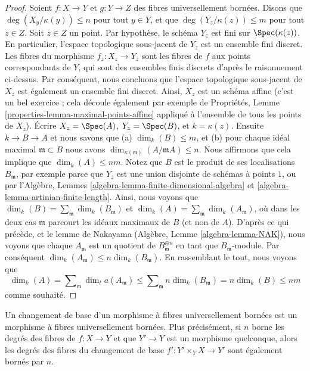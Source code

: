 \begin{proof}
Soient $f : X \to Y$ et $g : Y \to Z$ des fibres universellement bornées. Disons
que $\deg(X_y/\kappa(y)) \leq n$ pour tout $y \in Y$, et que $\deg(Y_z/\kappa(z)) \leq m$ pour tout $z \in Z$.
Soit $z \in Z$ un point. Par hypothèse,
le schéma $Y_z$ est fini sur $\Spec(\kappa(z))$. En particulier,
l'espace topologique sous-jacent
de $Y_z$ est un ensemble fini discret. Les fibres du
morphisme $f_z : X_z \to Y_z$ sont les fibres de $f$ aux
points correspondants de $Y$, qui sont des ensembles finis
discrets d'après le raisonnement ci-dessus. Par conséquent, nous concluons
que l'espace topologique sous-jacent de $X_z$ est
également un ensemble fini discret. Ainsi, $X_z$ est un schéma affine
(c'est un bel exercice ; cela découle également par exemple de
Propriétés, Lemme \ref{properties-lemma-maximal-points-affine} appliqué à l'ensemble
de tous les points de $X_z$). Écrire $X_z = \Spec(A)$, $Y_z = \Spec(B)$,
et $k = \kappa(z)$. Ensuite $k \to B \to A$ et
nous savons que (a) $\dim_k(B) \leq m$, et (b) pour chaque idéal
maximal $\mathfrak m \subset B$ nous avons
$\dim_{\kappa(\mathfrak m)}(A/\mathfrak mA) \leq n$. Nous affirmons que cela implique
que $\dim_k(A) \leq nm$. Notez que $B$
est le produit de ses localisations $B_{\mathfrak m}$, par exemple
parce que $Y_z$ est une union disjointe de schémas
à points $1$, ou par l'Algèbre, Lemmes \ref{algebra-lemma-finite-dimensional-algebra}
et \ref{algebra-lemma-artinian-finite-length}. Ainsi, nous
voyons que
$\dim_k(B) = \sum_{\mathfrak m} \dim_k(B_{\mathfrak m})$ et $\dim_k(A) = \sum_{\mathfrak m} \dim_k(A_{\mathfrak m})$, où dans les deux cas
$\mathfrak m$ parcourt les idéaux maximaux de $B$
(et non de $A$). D'après ce
qui précède, et le lemme de Nakayama (Algèbre,
Lemme \ref{algebra-lemma-NAK}), nous
voyons que chaque $A_{\mathfrak m}$ est un quotient
de $B_{\mathfrak m}^{\oplus n}$ en tant que $B_{\mathfrak m}$-module.
Par conséquent $\dim_k(A_{\mathfrak m}) \leq n \dim_k(B_{\mathfrak m})$. En rassemblant le
tout, nous voyons que
$$
\dim_k(A) = \sum\nolimits_{\mathfrak m} \dim_ta	(A_{\mathfrak m})
\leq \sum\nolimits_{\mathfrak m} n \dim_k(B_{\mathfrak m})
= n \dim_k(B) \leq nm
$$
comme souhaité.
\end{proof}

\begin{lemma}
\label{lemma-base-change-universally-bounded}
Un changement de base d'un morphisme à fibres universellement bornées
est un morphisme à fibres universellement bornées. Plus précisément,
si $n$ borne les degrés des fibres de $f : X \to Y$ et que $Y' \to Y$
est un morphisme quelconque, alors les degrés des fibres du changement de
base $f' : Y' \times_Y X \to Y'$ sont également bornés par $n$.
\end{lemma}

